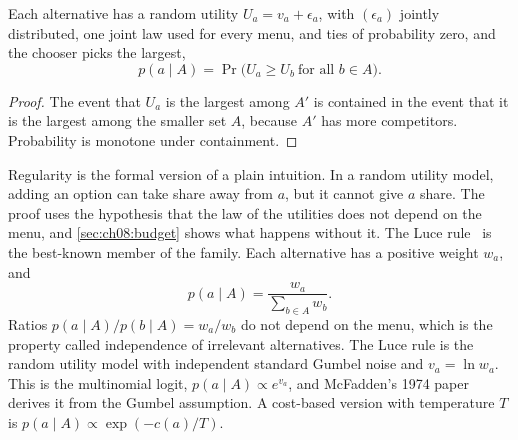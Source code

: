 \begin{definition}\label{def:ch08:rum}
Each alternative has a random utility $U_a=v_a+\epsilon_a$, with $(\epsilon_a)$ jointly distributed, one joint law used for every menu, and ties of probability zero, and the chooser picks the largest,
\begin{equation}\label{eq:ch08:rum}
p(a\mid A)=\Pr\big(U_a\ge U_b\ \text{for all }b\in A\big).
\end{equation}
\end{definition}


\begin{proof}
The event that $U_a$ is the largest among $A'$ is contained in the event that it is the largest among the smaller set $A$, because $A'$ has more competitors. Probability is monotone under containment.
\end{proof}

Regularity is the formal version of a plain intuition. In a random utility model, adding an option can take share away from $a$, but it cannot give $a$ share. The proof uses the hypothesis that the law of the utilities does not depend on the menu, and \cref{sec:ch08:budget} shows what happens without it. The Luce rule~\cite{luce1959} is the best-known member of the family. Each alternative has a positive weight $w_a$, and
\begin{equation}\label{eq:ch08:luce}
p(a\mid A)=\frac{w_a}{\sum_{b\in A}w_b}.
\end{equation}
Ratios $p(a\mid A)/p(b\mid A)=w_a/w_b$ do not depend on the menu, which is the property called independence of irrelevant alternatives. The Luce rule is the random utility model with independent standard Gumbel noise and $v_a=\ln w_a$. This is the multinomial logit, $p(a\mid A)\propto e^{v_a}$, and McFadden's 1974 paper~\cite{mcfadden1974} derives it from the Gumbel assumption. A cost-based version with temperature $T$ is $p(a\mid A)\propto\exp(-c(a)/T)$.



